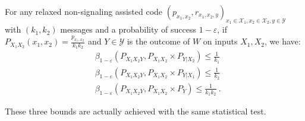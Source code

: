 \begin{lemma}
  \label{lem:beta}
    For any relaxed non-signaling assisted code $(p_{x_1,x_2}, r_{x_1,x_2,y})_{x_1 \in \mathcal{X}_1,x_2 \in \mathcal{X}_2,y \in \mathcal{Y}}$ with $(k_1,k_2)$ messages and a probability of success $1-\varepsilon$, if $P_{X_1X_2}(x_1,x_2)=\frac{p_{x_1,x_2}}{k_1k_2}$ and $Y \in \mathcal{Y}$ is the outcome of $W$ on inputs $X_1,X_2$, we have:
    \begin{equation}
      \begin{aligned}
        &\beta_{1-\varepsilon}\left(P_{X_1X_2Y},P_{X_1X_2} \times P_{Y|X_2}\right) \leq \frac{1}{k_1}\\
        &\beta_{1-\varepsilon}\left(P_{X_1X_2Y},P_{X_1X_2} \times P_{Y|X_1}\right) \leq \frac{1}{k_2}\\
        &\beta_{1-\varepsilon}\left(P_{X_1X_2Y},P_{X_1X_2} \times P_{Y}\right) \leq \frac{1}{k_1k_2}       \ .
      \end{aligned}
    \end{equation}
  \end{lemma}

\begin{rk}
  These three bounds are actually achieved with the same statistical test.
\end{rk}

